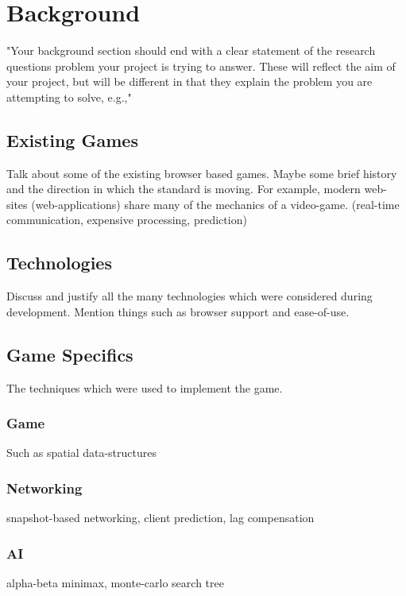 \documentclass{standalone}
\begin{document}
	\section{Background}
		"Your background section should end with a clear statement of the research questions problem your project is trying to answer. These will reflect the aim of your project, but will be different in that they explain the problem you are attempting to solve, e.g.,"

		\subsection{Existing Games}
			Talk about some of the existing browser based games. Maybe some brief history and the direction in which the standard is moving. For example, modern web-sites (web-applications) share many of the mechanics of a video-game. (real-time communication, expensive processing, prediction)

		\subsection{Technologies}
			Discuss and justify all the many technologies which were considered during development. Mention things such as browser support and ease-of-use.

		\subsection{Game Specifics}
			The techniques which were used to implement the game.

			\subsubsection{Game}
				Such as spatial data-structures

			\subsubsection{Networking}
				snapshot-based networking, client prediction, lag compensation

			\subsubsection{AI}
				alpha-beta minimax, monte-carlo search tree
\end{document}
